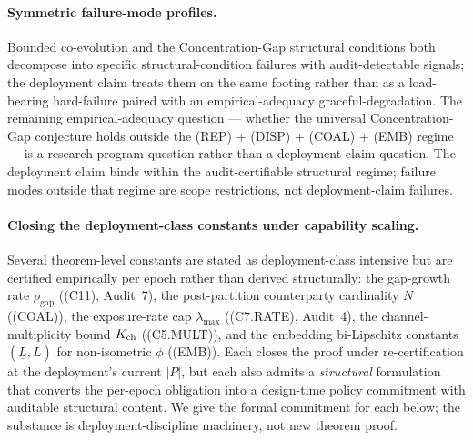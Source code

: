 \paragraph{Symmetric failure-mode profiles.}
Bounded co-evolution and the Concentration-Gap structural
conditions both decompose into specific structural-condition
failures with audit-detectable signals; the deployment claim
treats them on the same footing rather than as a load-bearing
hard-failure paired with an empirical-adequacy
graceful-degradation. The remaining empirical-adequacy
question --- whether the universal Concentration-Gap conjecture
holds outside the (REP) + (DISP) + (COAL) + (EMB) regime --- is a
research-program question rather than a deployment-claim
question.  The deployment claim binds within the audit-certifiable
structural regime; failure modes outside that regime are scope
restrictions, not deployment-claim failures.

\paragraph{Closing the deployment-class constants under capability scaling.}
Several theorem-level constants are stated as deployment-class
intensive but are certified empirically per epoch rather than
derived structurally: the gap-growth rate $\rho_{\mathrm{gap}}$
((C11), Audit~7), the post-partition counterparty cardinality
$N$ ((COAL)), the exposure-rate cap $\lambda_{\max}$
((C7.RATE), Audit~4), the channel-multiplicity bound $K_{\mathrm{ch}}$
((C5.MULT)), and the embedding bi-Lipschitz constants
$(\underline{L}, \bar{L})$ for non-isometric $\phi$ ((EMB)).
Each closes the proof under re-certification at the deployment's
current $|P|$, but each also admits a \emph{structural} formulation
that converts the per-epoch obligation into a design-time policy
commitment with auditable structural content. We give the
formal commitment for each below; the substance is
deployment-discipline machinery, not new theorem proof.

